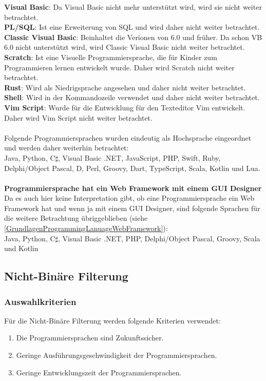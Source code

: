 \documentclass[ngerman]{article}
\begin{document}
    \textbf{Visual Basic}: Da Visual Basic nicht mehr unterstützt wird, wird sie nicht weiter betrachtet.\\
    \textbf{PL/SQL}: Ist eine Erweiterung von SQL und wird daher nicht weiter betrachtet.\\
    \textbf{Classic Visual Basic}: Beinhaltet die Verionen von 6.0 und früher. Da schon VB 6.0 nicht unterstützt wird, wird Classic Visual Basic nicht weiter betrachtet.\\
    \textbf{Scratch}: Ist eine Visuelle Programmiersprache, die für Kinder zum Programmieren lernen entwickelt wurde. Daher wird Scratch nicht weiter betrachtet.\\
    \textbf{Rust}: Wird als Niedrigsprache angesehen und daher nicht weiter betrachtet.\\
    \textbf{Shell}: Wird in der Kommandozeile verwendet und daher nicht weiter betrachtet.\\
    \textbf{Vim Script}: Wurde für die Entwicklung für den Texteditor Vim entwickelt. Daher wird Vim Script nicht weiter betrachtet.\\\\
    Folgende Programmiersprachen wurden eindeutig als Hochsprache eingeordnet und werden daher weiterhin betrachtet:\\
    Java, Python, C$\sharp$, Visual Basic .NET, JavaScript, PHP, Swift, Ruby, Delphi/Object Pascal, D, Perl, Groovy, Dart, TypeScript, Scala, Kotlin und Lua.\\\\
    \textbf{Programmiersprache hat ein Web Framework mit einem GUI Designer}\\
    Da es auch hier keine Interpretation gibt, ob eine Programmiersprache ein Web Framework hat und wenn ja mit einem GUI Designer, sind folgende Sprachen für die weitere Betrachtung übriggeblieben (siehe \ref{GrundlagenProgrammingLanuageWebFramework}):\\
    Java, Python, C$\sharp$, Visual Basic .NET, PHP, Delphi/Object Pascal, Groovy, Scala und Kotlin
    \subsection{Nicht-Binäre Filterung}
    \subsubsection{Auswahlkriterien}
    Für die Nicht-Binäre Filterung werden folgende Kriterien verwendet:
    \begin{enumerate}
        \item Die Programmiersprachen sind Zukunftssicher.
        \item Geringe Ausführungsgeschwindigkeit der Programmiersprachen.
        \item Geringe Entwicklungszeit der Programmiersprachen.
    \end{enumerate}
\end{document}
